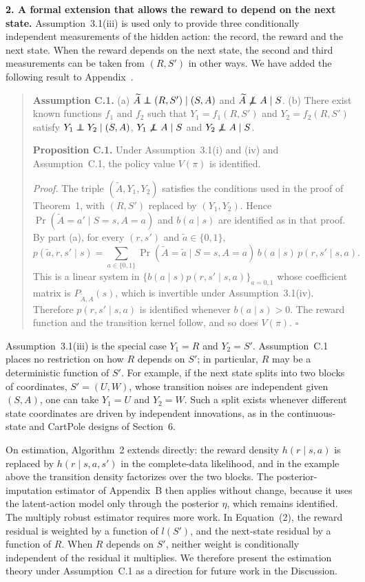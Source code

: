 \documentclass[12pt]{article}
\newcommand{\res}[1]{{\color{red}{#1}}}
\newcommand\independent{\protect\mathpalette{\protect\independenT}{\perp}}
\def\independenT#1#2{\mathrel{\rlap{$#1#2$}\mkern2mu{#1#2}}}
\newcommand{\nind}{\mathrel{\not\independent}}
\newcommand{\0}{\boldsymbol{0}}
\theoremstyle{definition}
\newenvironment{reproducedtext}{\begin{quote}\small}{\end{quote}}
\begin{document}
\textbf{2. A formal extension that allows the reward to depend on the next state.} Assumption~3.1(iii) is used only to provide three conditionally independent measurements of the hidden action: the record, the reward and the next state. When the reward depends on the next state, the second and third measurements can be taken from $(R,S')$ in other ways. We have added the following result to Appendix~\res{C}.
\begin{reproducedtext}
\textbf{Assumption C.1.} (a) $\widetilde A\independent (R,S')\mid (S,A)$ and $\widetilde A\nind A\mid S$. (b) There exist known functions $f_1$ and $f_2$ such that $Y_1=f_1(R,S')$ and $Y_2=f_2(R,S')$ satisfy $Y_1\independent Y_2\mid (S,A)$, $Y_1\nind A\mid S$ and $Y_2\nind A\mid S$.

\textbf{Proposition C.1.} Under Assumption~3.1(i) and (iv) and Assumption~C.1, the policy value $V(\pi)$ is identified.

\textit{Proof.} The triple $(\widetilde A,Y_1,Y_2)$ satisfies the conditions used in the proof of Theorem~1, with $(R,S')$ replaced by $(Y_1,Y_2)$. Hence $\Pr(\widetilde A=a'\mid S=s,A=a)$ and $b(a\mid s)$ are identified as in that proof. By part (a), for every $(r,s')$ and $\tilde a\in\{0,1\}$,
\[
p(\tilde a,r,s'\mid s)=\sum_{a\in\{0,1\}}\Pr(\widetilde A=\tilde a\mid S=s,A=a)\,b(a\mid s)\,p(r,s'\mid s,a).
\]
This is a linear system in $\{b(a\mid s)p(r,s'\mid s,a)\}_{a=0,1}$ whose coefficient matrix is $P_{\widetilde A,A}(s)$, which is invertible under Assumption~3.1(iv). Therefore $p(r,s'\mid s,a)$ is identified whenever $b(a\mid s)>0$. The reward function and the transition kernel follow, and so does $V(\pi)$. \hfill$\square$
\end{reproducedtext}
Assumption~3.1(iii) is the special case $Y_1=R$ and $Y_2=S'$. Assumption~C.1 places no restriction on how $R$ depends on $S'$; in particular, $R$ may be a deterministic function of $S'$. For example, if the next state splits into two blocks of coordinates, $S'=(U,W)$, whose transition noises are independent given $(S,A)$, one can take $Y_1=U$ and $Y_2=W$. Such a split exists whenever different state coordinates are driven by independent innovations, as in the continuous-state and CartPole designs of Section~6.

On estimation, Algorithm~2 extends directly: the reward density $h(r\mid s,a)$ is replaced by $h(r\mid s,a,s')$ in the complete-data likelihood, and in the example above the transition density factorizes over the two blocks. The posterior-imputation estimator of Appendix~B then applies without change, because it uses the latent-action model only through the posterior $\eta$, which remains identified. The multiply robust estimator requires more work. In Equation~(2), the reward residual is weighted by a function of $l(S')$, and the next-state residual by a function of $R$. When $R$ depends on $S'$, neither weight is conditionally independent of the residual it multiplies. We therefore present the estimation theory under Assumption~C.1 as a direction for future work in the Discussion.
\end{document}
